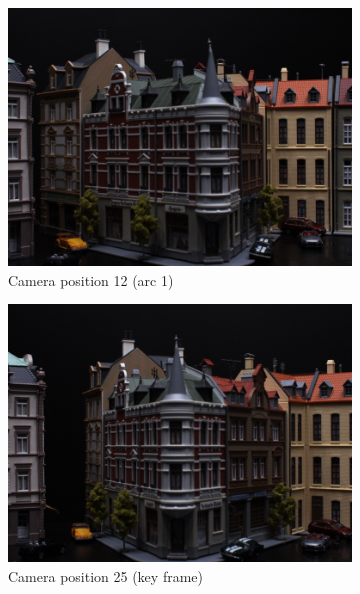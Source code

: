 \documentclass[thesis.tex]{subfiles}
\begin{document}
\begin{figure}[tb]
	\centering
	\begin{subfigure}[t]{0.32\textwidth}
		\includegraphics[width=\textwidth]{img/scene_04_img12_00.png}
		\caption{Camera position 12 (arc 1)}
		\label{fig:viewpoint_example_left}
	\end{subfigure}
	\begin{subfigure}[t]{0.32\textwidth}
		\includegraphics[width=\textwidth]{img/scene_04_img25_00.png}
		\caption{Camera position 25 (key frame)}
		\label{fig:viewpoint_example_keyframe}
	\end{subfigure}
	\begin{subfigure}[t]{0.32\textwidth}

\end{subfigure}
\end{figure}
\end{document}
